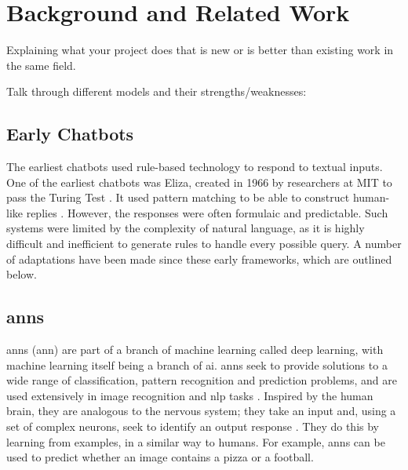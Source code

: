 \chapter{Background and Related Work}

\label{ch:background} 
\label{sec:background}


Explaining what your project does that is new or is better than existing work in the same field.



Talk through different models and their strengths/weaknesses:
\section{Early Chatbots}
\label{sec:background_early_chatbots}

The earliest chatbots used rule-based technology to respond to textual inputs. One of the earliest chatbots was Eliza, created in 1966 by researchers at MIT to pass the Turing Test \citep{zemvcik2019}. It used pattern matching to be able to construct human-like replies \citep{Luka}. However, the responses were often formulaic and predictable. Such systems were limited by the complexity of natural language, as it is highly difficult and inefficient to generate rules to handle every possible query. A number of adaptations have been made since these early frameworks, which are outlined below.


\section{\acrlong{ann}s}
\label{sec:background_anns}

\acrlong{ann}s (\acrshort{ann}) are part of a branch of machine learning called deep learning, with machine learning itself being a branch of \acrlong{ai}. \acrshort{ann}s seek to provide solutions to a wide range of classification, pattern recognition and prediction problems, and are used extensively in image recognition and \acrfull{nlp} tasks \citep{Abiodun}. Inspired by the human brain, they are analogous to the nervous system; they take an input and, using a set of complex neurons, seek to identify an output response \citep{Bishop}. They do this by learning from examples, in a similar way to humans. For example, \acrshort{ann}s can be used to predict whether an image contains a pizza or a football.

